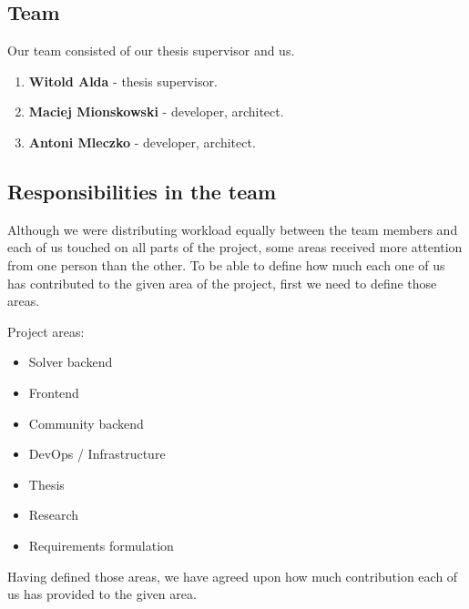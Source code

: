 \subsection{Team}

Our team consisted of our thesis supervisor and us.

\begin{enumerate}
	\item \textbf{Witold Alda} - thesis supervisor.
	\item \textbf{Maciej Mionskowski} - developer, architect.
	\item \textbf{Antoni Mleczko} - developer, architect.
\end{enumerate}

\subsection{Responsibilities in the team}

Although we were distributing workload equally between the team members
and each of us touched on all parts of the project, some areas 
received more attention from one person than the other.
To be able to define how much each one of us has contributed to the 
given area of the project, first we need to define those areas.
\smallskip

Project areas:
\begin{itemize}
	\item Solver backend
	\item Frontend
	\item Community backend
	\item DevOps / Infrastructure
	\item Thesis
	\item Research
	\item Requirements formulation
\end{itemize}

Having defined those areas, we have agreed upon how much contribution each of
us has provided to the given area.

